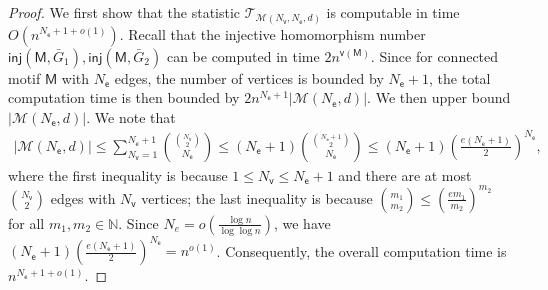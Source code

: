 \documentclass[letterpaper,11pt]{article}
\theoremstyle{definition}
\newcommand{\maM}{\mathcal{M}}
\newcommand{\maT}{\mathcal{T}}
\newcommand{\vn}{\mathsf{{v}}}
\newcommand{\pth}[1]{\left( #1 \right)}
\newcommand{\sfM}{{\mathsf{M}}}
\newcommand{\sfe}{{\mathsf{e}}}
\newcommand{\sfv}{{\mathsf{v}}}
\newcommand{\inj}{\mathsf{inj}}
\begin{document}
\begin{proof}

We first show that the statistic $\maT_{\maM(N_\sfv,N_\sfe,d)}$ is computable in time $O(n^{N_\sfe+1+o(1)})$. Recall that the injective homomorphism number $\inj(\sfM,\bar{G}_1),\inj(\sfM,\bar{G}_2)$ can be computed in time $2n^{\vn(\sfM)}$. Since for connected  motif $\sfM$ with $N_\sfe$ edges, the number of vertices is bounded by $N_\sfe+1$, the total computation time is then bounded by $2n^{N_\sfe+1}|\maM(N_\sfe,d)|$. We then upper bound $|\maM(N_\sfe,d)|$. We note that \begin{align*}
    |\maM(N_\sfe,d)|
\le \sum_{N_\sfv=1}^{N_\sfe+1}\binom{\binom{N_\sfv}{2}}{N_\sfe}
\le (N_\sfe+1)\binom{\binom{N_\sfe+1}{2}}{N_\sfe}
\le (N_\sfe+1)\pth{\frac{e(N_\sfe+1)}{2}}^{N_\sfe},
\end{align*}
where the first inequality is because $1\le N_\sfv\le N_\sfe+1$ and there are at most $\binom{N_\sfv}{2}$ edges with $N_\sfv$ vertices; the last inequality is because $\binom{m_1}{m_2}\le\pth{\frac{em_1}{m_2}}^{m_2}$ for all $m_1,m_2\in \mathbb{N}$. Since $N_e = o\pth{\frac{\log n}{\log \log n}}$, we have $(N_\sfe+1)\pth{\frac{e(N_\sfe+1)}{2}}^{N_\sfe} = n^{o(1)}$. Consequently, the overall computation time is $n^{N_\sfe+1+o(1)}$.



\end{proof}
\end{document}
